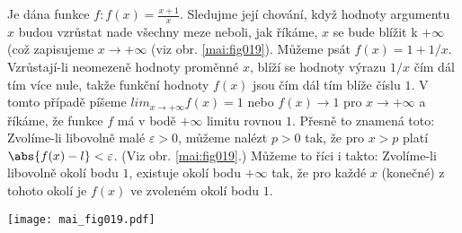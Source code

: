 \begin{mdframed}[style=mdexam]
  \begin{example}\label{MAI:exam030}
    Je dána funkce \(f: f(x) = \frac{x + 1}{x}\). Sledujme její chování, když hodnoty argumentu
    \(x\) budou vzrůstat nade všechny meze neboli, jak říkáme, \(x\) se bude blížit k \(+\infty\)
    (což zapisujeme \(x \to + \infty\) (viz obr. \ref{mai:fig019}). Můžeme psát \(f(x) = 1 + 1/x\).
    Vzrůstají-li neomezeně hodnoty proměnné \(x\), blíží se hodnoty výrazu \(1/x\) čím dál tím více
    nule, takže funkční hodnoty \(f(x)\) jsou čím dál tím blíže číslu \(1\). V tomto případě píšeme
    \(lim_{x\to+\infty} f(x) = 1\) nebo \(f(x) \to 1\) pro \(x\to +\infty\) a říkáme, že funkce
    \(f\) má v bodě \(+\infty\) limitu rovnou \(1\). Přesně to znamená toto: Zvolíme-li libovolně
    malé \(\varepsilon > 0\), můžeme nalézt \(p > 0\) tak, že pro \(x > p\) platí \(\abs{f(x) - l} <
    \varepsilon\). (Viz obr. \ref{mai:fig019}.) Můžeme to říci i takto: Zvolíme-li libovolně okolí
    bodu \(1\), existuje okolí bodu \(+\infty\) tak, že pro každé \(x\) (konečné) z tohoto okolí je
    \(f(x)\) ve zvoleném okolí bodu \(1\).
    
    {\centering
    \captionsetup{type=figure}
    \texttt{[image: mai\_fig019.pdf]}
    \par}
  \end{example}
\end{mdframed}















